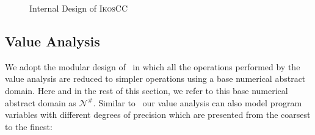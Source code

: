 \documentclass[a4]{article}
\newcommand{\ikoscc}{\textsc{IkosCC}\xspace}
\begin{document}
\begin{figure}[t]
\begin{center}
\begin{minipage}{1.0\linewidth}
\end{minipage}
\end{center}
\caption{Internal Design of \ikoscc}
\label{fig:ikoscc}
\end{figure}

\subsection{Value Analysis}
\label{subsec:value}

We adopt the modular design of~\cite{Mine06} in which all the
operations performed by the value analysis are reduced to simpler
operations using a base numerical abstract domain. Here and in the
rest of this section, we refer to this base numerical abstract domain
as $\mathcal{N}^{\#}$. Similar to~\cite{Mine06} our value analysis can
also model program variables with different degrees of precision which
are presented from the coarsest to the finest:
\end{document}
